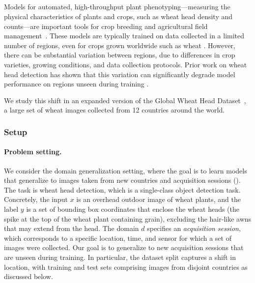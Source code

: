 \subsection{\Wheat}\label{sec:app_wheat}

Models for automated, high-throughput plant phenotyping---measuring the physical characteristics of plants and crops, such as wheat head density and counts---are important tools for crop breeding \citep{thorp2018high,reynolds2020breeder} and agricultural field management~\citep{shi2016uav}.
These models are typically trained on data collected in a limited number of regions, even for crops grown worldwide such as wheat \citep{madec2019ear, xiong2019tasselnetv2,ubbens2020autocount, ayalew2020unsupervised}.
However, there can be substantial variation between regions, due to differences in crop varieties, growing conditions, and data collection protocols.
Prior work on wheat head detection has shown that this variation can significantly degrade model performance on regions unseen during training \citep{david2020global}.

We study this shift in an expanded version of the Global Wheat Head Dataset~\citep{david2020global,david2021global}, a large set of wheat images collected from 12 countries around the world.

\subsubsection{Setup}
\paragraph{Problem setting.}
We consider the domain generalization setting, where the goal is to learn models that generalize to images taken from new countries and acquisition sessions ().
The task is wheat head detection, which is a single-class object detection task.
Concretely, the input $x$ is an overhead outdoor image of wheat plants, and the label $y$ is a set of bounding box coordinates that enclose the wheat heads (the spike at the top of the wheat plant containing grain), excluding the hair-like awns that may extend from the head.
The domain $d$ specifies an \emph{acquisition session}, which corresponds to a specific location, time, and sensor for which a set of images were collected.
Our goal is to generalize to new acquisition sessions that are unseen during training.
In particular, the dataset split captures a shift in location, with training and test sets comprising images from disjoint countries as discussed below.

